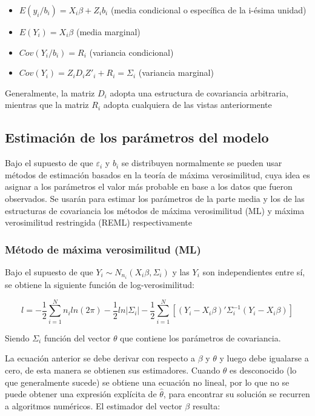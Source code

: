 \documentclass[spanish]{article}
\numberwithin{figure}{subsection}
\numberwithin{equation}{subsection}
\numberwithin{table}{subsection}
\begin{document}
\begin{itemize}
	\item $E(y_i/b_i) = X_i\beta + Z_ib_i$ (media condicional o específica de
	la i-ésima unidad)
	\item $E(Y_i) = X_i\beta$ (media marginal)
	\item $Cov(Y_i/b_i) = R_i$ (variancia condicional)
	\item $Cov(Y_i) = Z_iD_iZ'_i + R_i = \varSigma_i$ (variancia marginal)
\end{itemize}

Generalmente, la matriz $D_i$ adopta una estructura de covariancia arbitraria,
mientras que la matriz $R_i$ adopta cualquiera de las vistas anteriormente

\subsection{Estimación de los parámetros del modelo}

Bajo el supuesto de que $\varepsilon_i$ y $b_i$ se distribuyen normalmente se
pueden usar métodos de estimación basados en la teoría de máxima verosimilitud,
cuya idea es asignar a los parámetros el valor más probable en base a los datos
que fueron observados. Se usarán para estimar los parámetros de la parte media
y los de las estructuras de covariancia los métodos de máxima verosimilitud
(ML) y máxima verosimilitud restringida (REML) respectivamente

\subsubsection{Método de máxima verosimilitud (ML)}

Bajo el supuesto de que $Y_i \sim N_{n_i}(X_i\beta, \varSigma_i)$ y las $Y_i$
son independientes entre sí, se obtiene la siguiente función de
log-verosimilitud:

\begin{equation}
\label{ML}
	l = -\frac{1}{2} \sum_{i=1}^{N}n_i ln(2\pi) - \frac{1}{2}ln|\varSigma_i| -
	\frac{1}{2} \sum_{i=1}^{N} [(Y_i - X_i\beta)'
	\varSigma_i^{-1} (Y_i - X_i\beta)]
\end{equation}

Siendo $\varSigma_i$ función del vector $\theta$ que contiene los parámetros de
covariancia.

La ecuación anterior se debe derivar con respecto a $\beta$ y $\theta$ y luego
debe igualarse a cero, de esta manera se obtienen sus estimadores. Cuando
$\theta$ es desconocido (lo que generalmente sucede) se obtiene una ecuación no
lineal, por lo que no se puede obtener una expresión explícita de
$\hat{\theta}$, para encontrar su solución se recurren a algoritmos numéricos.
El estimador del vector $\beta$ resulta:
\end{document}
